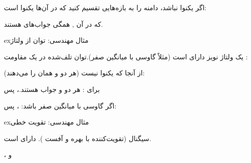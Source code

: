اگر  یکنوا نباشد، دامنه را به بازه‌هایی تقسیم کنید که در آن‌ها  یکنوا است:


که در آن ,  همگی جواب‌های  هستند.

\begin{PSbox}[unbreakable]{ex}{مثال مهندسی: توان از ولتاژ}

یک ولتاژ نویز  دارای  است (مثلاً گاوسی با میانگین صفر).\PSbr{}توان تلف‌شده در یک مقاومت \lr{\mbox{1\ensuremath{\Omega}}}: 

از آنجا که  یکنوا نیست (هر دو  و  همان  را می‌دهند):

برای : هر دو  و  جواب هستند.\PSbr{}، پس 


اگر  گاوسی با میانگین صفر باشد: ، پس:

\end{PSbox}

\begin{PSbox}[unbreakable]{ex}{مثال مهندسی: تقویت خطی}

سیگنال  (تقویت‌کننده با بهره  و آفست ).\PSbr{} دارای  است.

، و 


\end{PSbox}


